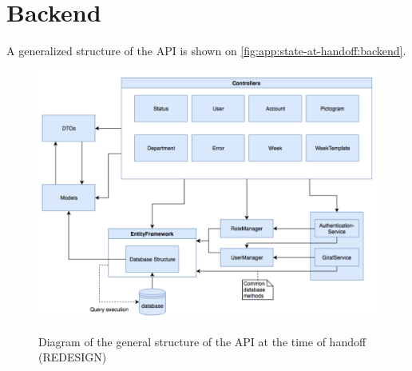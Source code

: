 \section{Backend}\label{app:state-at-handoff:backend}

A generalized structure of the API is shown on \autoref{fig:app:state-at-handoff:backend}.

\begin{figure}[h]
    \centering
    \caption{Diagram of the general structure of the API at the time of handoff (REDESIGN)}
    \includegraphics[width=1\textwidth]{figures/api_gen_struct_ho.png}
    \label{fig:app:state-at-handoff:backend}
\end{figure}
